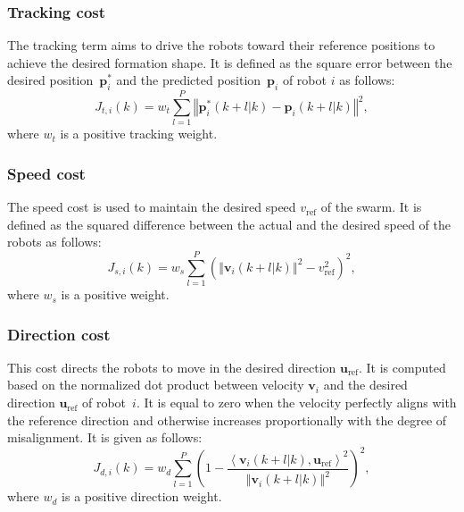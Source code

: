 \subsubsection{Tracking cost}\label{sec:tracking_term}
The tracking term aims to drive the robots toward their reference positions to achieve the desired formation shape. It is defined as the square error between the desired position~$\mathbf{p}_i^*$ and the predicted position~$\mathbf{p}_i$ of robot $i$ as follows:
\begin{equation}
    J_{t,i}(k)=w_t\sum_{l=1}^P{\left\Vert \mathbf{p}^*_i(k+l|k)-\mathbf{p}_i(k+l|k)\right\Vert^2},
\end{equation}
where $w_t$ is a positive tracking weight.

\subsubsection{Speed cost}
The speed cost is used to maintain the desired speed $v_\text{ref}$ of the swarm. It is defined as the squared difference between the actual and the desired speed of the robots as follows:
\begin{equation}
    J_{s,i}(k)=w_s\sum_{l=1}^P\left(\left\Vert \mathbf{v}_i(k+l|k)\right\Vert^2-v_\text{ref}^2\right)^2,
\end{equation}
where $w_s$ is a positive weight.

\subsubsection{Direction cost}
This cost directs the robots to move in the desired direction $\mathbf{u}_\text{ref}$. It is computed based on the normalized dot product between velocity $\mathbf{v}_i$ and the desired direction $\mathbf{u}_\text{ref}$ of robot~$i$. It is equal to zero when the velocity perfectly aligns with the reference direction and otherwise increases proportionally with the degree of misalignment. It is given as follows:
\begin{equation}
    J_{d,i}(k)=w_d\sum_{l=1}^P{\left(1-\dfrac{\left\langle \mathbf{v}_i\left(k+l|k\right),\mathbf{u}_\text{ref}\right\rangle^2}{\left\Vert \mathbf{v}_i(k+l|k)\right\Vert^2}\right)^2},
\end{equation}
where $w_d$ is a positive direction weight.

